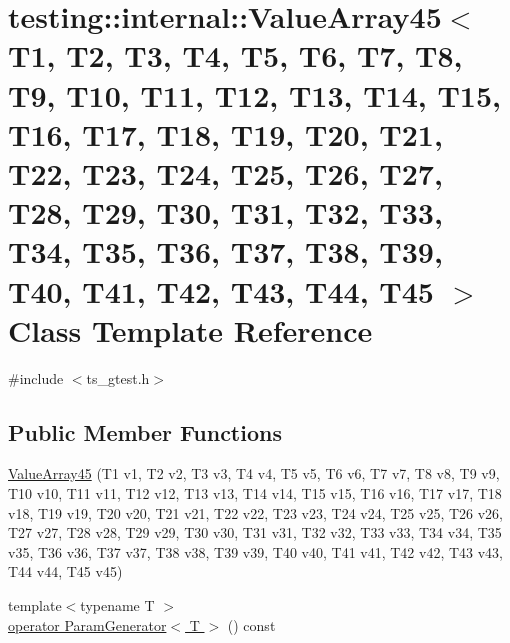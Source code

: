 \hypertarget{classtesting_1_1internal_1_1ValueArray45}{\section{testing\-:\-:internal\-:\-:Value\-Array45$<$ T1, T2, T3, T4, T5, T6, T7, T8, T9, T10, T11, T12, T13, T14, T15, T16, T17, T18, T19, T20, T21, T22, T23, T24, T25, T26, T27, T28, T29, T30, T31, T32, T33, T34, T35, T36, T37, T38, T39, T40, T41, T42, T43, T44, T45 $>$ Class Template Reference}
\label{classtesting_1_1internal_1_1ValueArray45}
}


{\ttfamily \#include $<$ts\-\_\-gtest.\-h$>$}

\subsection*{Public Member Functions}
\begin{DoxyCompactItemize}
\item 
\hyperlink{classtesting_1_1internal_1_1ValueArray45_ae00a887c072b07db3e1548dd89ecbf53}{Value\-Array45} (T1 v1, T2 v2, T3 v3, T4 v4, T5 v5, T6 v6, T7 v7, T8 v8, T9 v9, T10 v10, T11 v11, T12 v12, T13 v13, T14 v14, T15 v15, T16 v16, T17 v17, T18 v18, T19 v19, T20 v20, T21 v21, T22 v22, T23 v23, T24 v24, T25 v25, T26 v26, T27 v27, T28 v28, T29 v29, T30 v30, T31 v31, T32 v32, T33 v33, T34 v34, T35 v35, T36 v36, T37 v37, T38 v38, T39 v39, T40 v40, T41 v41, T42 v42, T43 v43, T44 v44, T45 v45)
\item 
{\footnotesize template$<$typename T $>$ }\\\hyperlink{classtesting_1_1internal_1_1ValueArray45_aa9530dada13a522e61d125f78111c8fa}{operator Param\-Generator$<$ T $>$} () const 
\end{DoxyCompactItemize}


